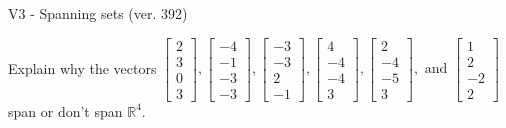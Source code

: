 \begin{exercise}
  \begin{exerciseTitle}V3 - Spanning sets (ver. 392)\end{exerciseTitle}
  \begin{exerciseStatement}
    Explain why the vectors \(\left[\begin{array}{r}
2 \\
3 \\
0 \\
3
\end{array}\right] , \left[\begin{array}{r}
-4 \\
-1 \\
-3 \\
-3
\end{array}\right] , \left[\begin{array}{r}
-3 \\
-3 \\
2 \\
-1
\end{array}\right] , \left[\begin{array}{r}
4 \\
-4 \\
-4 \\
3
\end{array}\right] , \left[\begin{array}{r}
2 \\
-4 \\
-5 \\
3
\end{array}\right] , \text{ and } \left[\begin{array}{r}
1 \\
2 \\
-2 \\
2
\end{array}\right]\) span or don't span \(\mathbb{R}^4\). 
	



\end{exerciseStatement}
\end{exercise}
